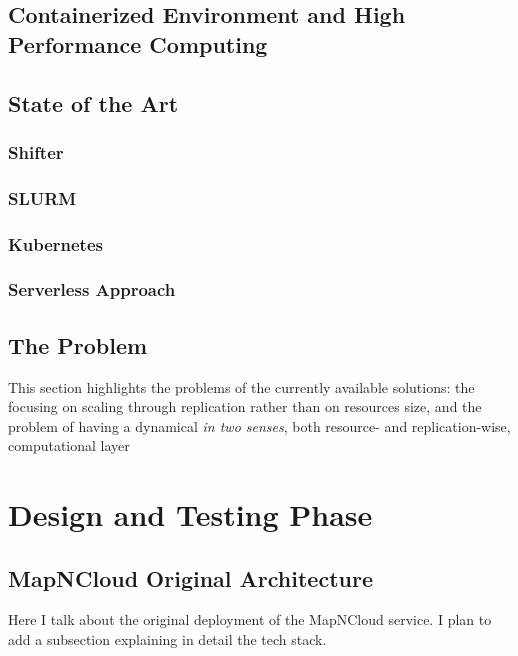 \documentclass{Configuration_Files/PoliMi3i_thesis}
\begin{document}
		\section{Containerized Environment and High Performance Computing}
		\label{se:containerHPC}
		
		\section{State of the Art}
		\label{se:stateoftheart}
		
			\subsection{Shifter}
			\label{sse:shifter}
			
			\subsection{SLURM}
			\label{sse:slurm}
			
			\subsection{Kubernetes}
			\label{sse:kubernetes}
			
			\subsection{Serverless Approach}
			\label{sse:serverless}
		
		\section{The Problem}
		\label{se:problem}
			This section highlights the problems of the currently available solutions: the focusing on scaling through replication rather than on resources size, and the problem of having a dynamical \textit{in two senses}, both resource- and replication-wise, computational layer
	
	\chapter{Design and Testing Phase}
	\label{ch:designandtesting}

		\section{MapNCloud Original Architecture}
		\label{se:originalarchitecture}
			Here I talk about the original deployment of the MapNCloud service. I plan to add a subsection explaining in detail the tech stack.
\end{document}
